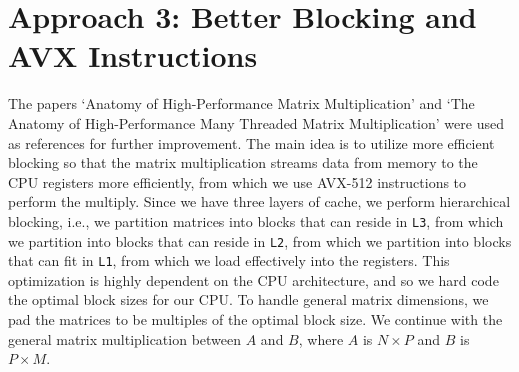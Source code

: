 \documentclass{article}
\begin{document}
\section{Approach 3: Better Blocking and AVX Instructions}
The papers `Anatomy of High-Performance Matrix Multiplication' \cite{ANATOMY} and 
`The Anatomy of High-Performance Many Threaded Matrix Multiplication' \cite{6877334}
were used as references for further improvement. The main idea is to utilize more efficient 
blocking so that the matrix multiplication streams data from memory to the CPU registers
more efficiently, from which we use AVX-512 instructions to perform the multiply. Since 
we have three layers of cache, we perform hierarchical blocking, i.e., 
we partition matrices into blocks that can reside in \texttt{L3}, from which we 
partition into blocks that can reside in \texttt{L2}, from which we 
partition into blocks that can fit in \texttt{L1}, from which we load effectively into the registers. This optimization 
is highly dependent on the CPU architecture, and so we hard code the optimal block sizes
for our CPU. To handle general matrix dimensions, we pad the matrices to be multiples of the
optimal block size. We continue with the general matrix multiplication between 
$A$ and $B$, where $A$ is $N \times P$ and $B$ is $P \times M$.
\newpage
\end{document}
